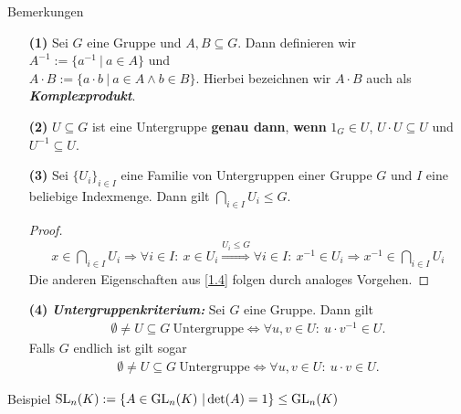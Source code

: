 \begin{generic_no_num}{Bemerkungen} \

\begin{enumerate}
\item[\textbf{(1)}]
Sei $G$ eine Gruppe und $A,B \subseteq G$.
Dann definieren wir $A^{-1} := \lbrace a^{-1} \ | \ a \in A\rbrace$
und \\ 
$A \cdot B := \lbrace a \cdot b \ | \ a \in A \wedge b \in B \rbrace$.
Hierbei bezeichnen wir $A \cdot B$ auch als \textbf{\textit{Komplexprodukt}}. 

\item[\textbf{(2)}]
$U \subseteq G$ ist eine Untergruppe \textbf{genau dann}, \textbf{wenn}
$1_G \in U$, $U \cdot U \subseteq U$ und $ U^{-1} \subseteq U$. 

\item[\textbf{(3)}]
Sei $\lbrace U_i \rbrace_{i \in I}$ eine Familie von Untergruppen einer Gruppe $G$ und 
$I$ eine beliebige Indexmenge.
Dann gilt $\bigcap_{i \in I} U_i \leq G$.
\begin{proof}
\begin{align*}
x \in \bigcap_{i \in I} U_i \Rightarrow 
\forall i \in I : \ x \in U_i \stackrel{U_i \leq G}{\Rightarrow }
\forall i \in I : \ x^{-1} \in U_i \Rightarrow
x^{-1} \in \bigcap_{i \in I} U_i
\end{align*}
Die anderen Eigenschaften aus \ref{1.4} folgen durch analoges Vorgehen.
\end{proof}

\item[\textbf{(4)}]
\textbf{\textit{Untergruppenkriterium:}} 
Sei $G$ eine Gruppe. Dann gilt
\begin{align*}
\emptyset \neq U \subseteq G \ \text{Untergruppe} 
\Leftrightarrow
\forall u,v \in U : \ u \cdot v^{-1} \in U.
\end{align*}
Falls $G$ endlich ist gilt sogar
\begin{align*}
\emptyset \neq U \subseteq G \ \text{Untergruppe} 
\Leftrightarrow
\forall u,v \in U : \ u \cdot v \in U.
\end{align*}
\end{enumerate}
\end{generic_no_num}

\begin{genericdf}{Beispiel}
$\operatorname{SL}_n(K) := \lbrace A \in \operatorname{GL}_n(K) \ | \det(A) = 1   \rbrace \leq \operatorname{GL}_n(K)$
\end{genericdf}


